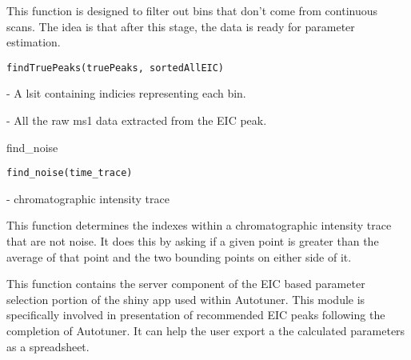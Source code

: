 \documentclass[a4paper]{book}
\begin{document}
%
\begin{Description}\relax
This function is designed to filter out bins that don't come from
continuous scans. The idea is that after this stage, the data is ready for
parameter estimation.
\end{Description}
%
\begin{Usage}
\begin{verbatim}
findTruePeaks(truePeaks, sortedAllEIC)
\end{verbatim}
\end{Usage}
%
\begin{Arguments}
\begin{ldescription}
\item[\code{truePeaks}] - A lsit containing indicies representing each bin.

\item[\code{sortedAllEIC}] - All the raw ms1 data extracted from the EIC peak.
\end{ldescription}
\end{Arguments}
%
\begin{Description}\relax
find\_noise
\end{Description}
%
\begin{Usage}
\begin{verbatim}
find_noise(time_trace)
\end{verbatim}
\end{Usage}
%
\begin{Arguments}
\begin{ldescription}
\item[\code{time\_trace}] - chromatographic intensity trace
\end{ldescription}
\end{Arguments}
%
\begin{Value}
This function determines the indexes within a chromatographic intensity trace
that are not noise. It does this by asking if a given point is greater than the average
of that point and the two bounding points on either side of it.
\end{Value}
%
\begin{Description}\relax
This function contains the server component of the EIC based
parameter selection portion of the shiny app used within Autotuner. This
module is specifically involved in presentation of recommended EIC peaks
following the completion of Autotuner. It can help the user export a
the calculated parameters as a spreadsheet.
\end{Description}
\end{document}
